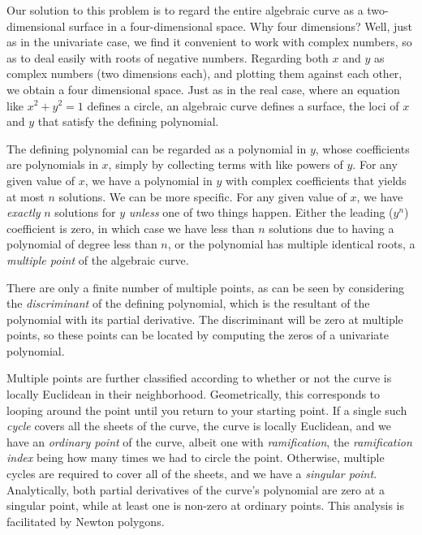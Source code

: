 Our solution to this problem is to regard the entire algebraic curve
as a two-dimensional surface in a four-dimensional space.  Why four
dimensions?  Well, just as in the univariate case, we find it
convenient to work with complex numbers, so as to deal easily with
roots of negative numbers.  Regarding both $x$ and $y$ as complex
numbers (two dimensions each), and plotting them against each other,
we obtain a four dimensional space.  Just as in the real case, where
an equation like $x^2 + y^2 = 1$ defines a circle, an algebraic curve
defines a surface, the loci of $x$ and $y$ that satisfy the defining
polynomial.

The defining polynomial can be regarded as a polynomial in $y$, whose
coefficients are polynomials in $x$, simply by collecting terms with
like powers of $y$.  For any given value of $x$, we have a polynomial
in $y$ with complex coefficients that yields at most $n$ solutions.
We can be more specific.  For any given value of $x$, we have {\it
exactly} $n$ solutions for $y$ {\it unless} one of two things happen.
Either the leading ($y^n$) coefficient is zero, in which case we have
less than $n$ solutions due to having a polynomial of degree less than
$n$, or the polynomial has multiple identical roots, a {\it multiple
point} of the algebraic curve.

There are only a finite number of multiple points, as can be seen by
considering the {\it discriminant} of the defining polynomial, which
is the resultant of the polynomial with its partial derivative.  The
discriminant will be zero at multiple points, so these points can be
located by computing the zeros of a univariate polynomial.


Multiple points are further classified according to whether or not the
curve is locally Euclidean in their neighborhood.  Geometrically, this
corresponds to looping around the point until you return to your
starting point.  If a single such {\it cycle} covers all the sheets of
the curve, the curve is locally Euclidean, and we have an {\it
ordinary point} of the curve, albeit one with {\it ramification}, the
{\it ramification index} being how many times we had to circle the
point.  Otherwise, multiple cycles are required to cover all of the
sheets, and we have a {\it singular point}.  Analytically, both
partial derivatives of the curve's polynomial are zero at a singular
point, while at least one is non-zero at ordinary points.  This
analysis is facilitated by Newton polygons.

